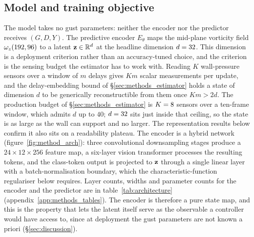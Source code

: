
\subsection{Model and training objective}
\label{sec:methods_arch}
\label{sec:methods_loss}

The model takes no gust parameters: neither the encoder nor the predictor receives $(G, D, Y)$. The predictive encoder $E_\theta$ maps the mid-plane vorticity field $\omega_z(192,96)$ to a latent $\mathbf{z} \in \mathbb{R}^d$ at the headline dimension $d = 32$. This dimension is a deployment criterion rather than an accuracy-tuned choice, and the criterion is the sensing budget the estimator has to work with. Reading $K$ wall-pressure sensors over a window of $m$ delays gives $Km$ scalar measurements per update, and the delay-embedding bound of \S\ref{sec:methods_estimator} holds a state of dimension $d$ to be generically reconstructible from them once $Km > 2d$. The production budget of \S\ref{sec:methods_estimator} is $K = 8$ sensors over a ten-frame window, which admits $d$ up to $40$; $d = 32$ sits just inside that ceiling, so the state is as large as the wall can support and no larger. The representation results below confirm it also sits on a readability plateau. The encoder is a hybrid network (figure~\ref{fig:method_arch}): three convolutional downsampling stages produce a $24 \times 12 \times 256$ feature map, a six-layer vision transformer processes the resulting tokens, and the class-token output is projected to $\mathbf{z}$ through a single linear layer with a batch-normalisation boundary, which the characteristic-function regulariser below requires. Layer counts, widths and parameter counts for the encoder and the predictor are in table~\ref{tab:architecture} (appendix~\ref{app:methods_tables}). The encoder is therefore a pure state map, and this is the property that lets the latent itself serve as the observable a controller would have access to, since at deployment the gust parameters are not known a priori (\S\ref{sec:discussion}).\re

